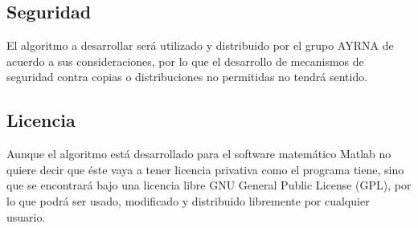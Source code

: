		\subsection{Seguridad}
		
			El algoritmo a desarrollar será utilizado y distribuido por el grupo AYRNA de acuerdo a sus consideraciones, por lo que el desarrollo de mecanismos de seguridad contra copias o distribuciones no permitidas no tendrá sentido.
		
		\subsection{Licencia}

			Aunque el algoritmo está desarrollado para el software matemático Matlab no quiere decir que éste vaya a tener licencia privativa como el programa tiene, sino que se encontrará bajo una licencia libre GNU General Public License (GPL), por lo que podrá ser usado, modificado y distribuido libremente por cualquier usuario.
